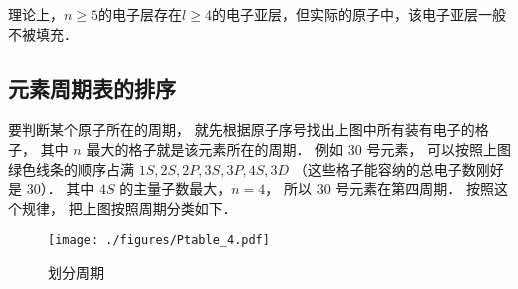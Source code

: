 理论上，$n\ge5$的电子层存在$l\ge4$的电子亚层，但实际的原子中，该电子亚层一般不被填充．

\subsection{元素周期表的排序}

要判断某个原子所在的周期， 就先根据原子序号找出上图中所有装有电子的格子， 其中 $n$ 最大的格子就是该元素所在的周期． 例如 30 号元素， 可以按照上图绿色线条的顺序占满 $1S, 2S, 2P, 3S, 3P, 4S, 3D$ （这些格子能容纳的总电子数刚好是 30）． 其中 $4S$ 的主量子数最大，$n=4$， 所以 30 号元素在第四周期． 按照这个规律， 把上图按照周期分类如下．
\begin{figure}[ht]
\centering
\texttt{[image: ./figures/Ptable\_4.pdf]}
\caption{划分周期} 
\end{figure}

